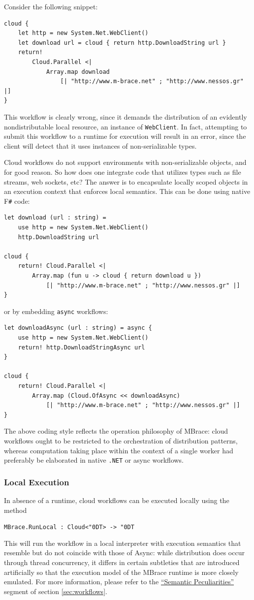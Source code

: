 \documentclass[9pt,a4paper]{article}
\newcommand{\mbrace}{MBrace}
\newcommand{\fsharp}{F\texttt \#}
\newcommand{\dotnet}{\texttt{\hbox{.}NET}}
\newcommand{\centertt}[1]{\begin{center}\texttt{#1}\end{center}}
\newcommand{\uq}{\char"0D}
\begin{document}
\noindent Consider the following snippet:
\begin{lstlisting}
cloud {
	let http = new System.Net.WebClient()
	let download url = cloud { return http.DownloadString url }
	return! 
		Cloud.Parallel <| 
			Array.map download 
				[| "http://www.m-brace.net" ; "http://www.nessos.gr" |]
}
\end{lstlisting}
This workflow is clearly wrong, since it demands the distribution of an evidently
nondistributable local resource, an instance of \texttt{WebClient}.
In fact, attempting to submit this workflow to a runtime for execution will result in
an error, since the client will detect that it uses instances of non-serializable 
types.

Cloud workflows do not support environments with non-serializable objects,
and for good reason. So how does one integrate code that utilizes types such
as file streams, web sockets, etc?
%
The answer is to encapsulate locally scoped objects in an execution context
that enforces local semantics. This can be done using native \fsharp{} code:
\begin{lstlisting}
let download (url : string) =
	use http = new System.Net.WebClient()
	http.DownloadString url

cloud {
	return! Cloud.Parallel <|
		Array.map (fun u -> cloud { return download u })
			[| "http://www.m-brace.net" ; "http://www.nessos.gr" |]
}
\end{lstlisting}
or by embedding \texttt{async} workflows:
\begin{lstlisting}
let downloadAsync (url : string) = async {
	use http = new System.Net.WebClient()
	return! http.DownloadStringAsync url
}

cloud {
	return! Cloud.Parallel <|
		Array.map (Cloud.OfAsync << downloadAsync)
			[| "http://www.m-brace.net" ; "http://www.nessos.gr" |]
} 
\end{lstlisting}

The above coding style reflects the operation philosophy of \mbrace:
cloud workflows ought to be restricted to the orchestration of distribution patterns, 
whereas computation taking place within the context of a single worker 
had preferably be elaborated in native \dotnet{} or async workflows.

\subsubsection*{Local Execution}

In absence of a runtime, cloud workflows can be executed locally using the method
%
\centertt{MBrace.RunLocal : Cloud<\uq{}T> -> \uq{}T}
%
This will run the workflow in a local interpreter with execution semantics that resemble
but do not coincide with those of Async: while distribution does occur through thread 
concurrency, it differs in certain subtleties that are introduced artificially so that 
the execution model of the \mbrace{} runtime is more closely emulated.
For more information, please refer to the \href{peculiarities}{``Semantic Peculiarities''}
segment of section \ref{sec:workflows}.
\end{document}
